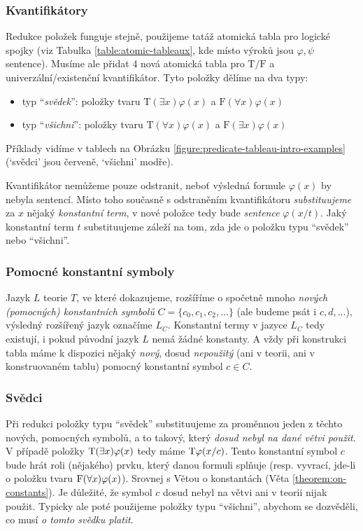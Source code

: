 \subsubsection{Kvantifikátory}
Redukce položek funguje stejně, použijeme tatáž atomická tabla pro logické spojky (viz Tabulka \ref{table:atomic-tableaux}, kde místo výroků jsou $\varphi,\psi$ sentence). Musíme ale přidat 4 nová atomická tabla pro $\mathrm T/\mathrm F$ a univerzální/existenční kvantifikátor. Tyto položky dělíme na dva typy:
\begin{itemize}
    \item typ ``\emph{svědek}'': položky tvaru $\mathrm{T}(\exists x)\varphi(x)$ a $\mathrm{F}(\forall x)\varphi(x)$
    \item typ ``\emph{všichni}'': položky tvaru $\mathrm{T}(\forall x)\varphi(x)$ a $\mathrm{F}(\exists x)\varphi(x)$    
\end{itemize}
Příklady vidíme v tablech na Obrázku \ref{figure:predicate-tableau-intro-examples} (`svědci' jsou červeně, `všichni' modře).

Kvantifikátor nemůžeme pouze odstranit, neboť výsledná formule $\varphi(x)$ by nebyla sentencí. Místo toho současně s odstraněním kvantifikátoru \emph{substituujeme} za $x$ nějaký \emph{konstantní term}, v nové položce tedy bude \emph{sentence} $\varphi(x/t)$. Jaký konstantní term $t$ substituujeme záleží na tom, zda jde o položku typu ``svědek'' nebo ``všichni''. 

\subsubsection{Pomocné konstantní symboly}
Jazyk $L$ teorie $T$, ve které dokazujeme, rozšíříme o spočetně mnoho \emph{nových (pomocných) konstantních symbolů} $C=\{c_0,c_1,c_2,\dots\}$ (ale budeme psát i $c,d,\dots$), výsledný rozšířený jazyk označíme $L_C$. Konstantní termy v jazyce $L_C$ tedy existují, i pokud původní jazyk $L$ nemá žádné konstanty. A vždy při konstrukci tabla máme k dispozici nějaký \emph{nový}, dosud \emph{nepoužitý} (ani v teorii, ani v konstruovaném tablu) pomocný konstantní symbol $c\in C$.

\subsubsection{Svědci}
Při redukci položky typu ``svědek'' substituujeme za proměnnou jeden z těchto nových, pomocných symbolů, a to takový, který \emph{dosud nebyl na dané větvi použit}. V případě položky $\mathrm{T}(\exists x)\varphi(x)$ tedy máme $\mathrm{T}\varphi(x/c)$. Tento konstantní symbol $c$ bude hrát roli (nějakého) prvku, který danou formuli splňuje (resp. vyvrací, jde-li o položku tvaru $\mathrm{F}(\forall x)\varphi(x)$). Srovnej s Větou o konstantách (Věta \ref{theorem:on-constants}). Je důležité, že symbol $c$ dosud nebyl na větvi ani v teorii nijak použit. Typicky ale poté použijeme položky typu ``všichni'', abychom se dozvěděli, co musí \emph{o tomto svědku platit}.


